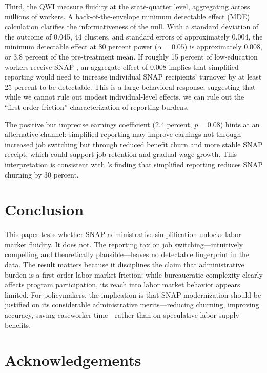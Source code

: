\documentclass[12pt]{article}
\begin{document}
Third, the QWI measure fluidity at the state-quarter level, aggregating across millions of workers. A back-of-the-envelope minimum detectable effect (MDE) calculation clarifies the informativeness of the null. With a standard deviation of the outcome of 0.045, 44 clusters, and standard errors of approximately 0.004, the minimum detectable effect at 80 percent power ($\alpha = 0.05$) is approximately 0.008, or 3.8 percent of the pre-treatment mean. If roughly 15 percent of low-education workers receive SNAP \citep{gray2019snap}, an aggregate effect of 0.008 implies that simplified reporting would need to increase individual SNAP recipients' turnover by at least 25 percent to be detectable. This is a large behavioral response, suggesting that while we cannot rule out modest individual-level effects, we can rule out the ``first-order friction'' characterization of reporting burdens.

The positive but imprecise earnings coefficient (2.4 percent, $p = 0.08$) hints at an alternative channel: simplified reporting may improve earnings not through increased job switching but through reduced benefit churn and more stable SNAP receipt, which could support job retention and gradual wage growth. This interpretation is consistent with \citet{gray2019snap}'s finding that simplified reporting reduces SNAP churning by 30 percent.

\section{Conclusion}

This paper tests whether SNAP administrative simplification unlocks labor market fluidity. It does not. The reporting tax on job switching---intuitively compelling and theoretically plausible---leaves no detectable fingerprint in the data. The result matters because it disciplines the claim that administrative burden is a first-order labor market friction: while bureaucratic complexity clearly affects program participation, its reach into labor market behavior appears limited. For policymakers, the implication is that SNAP modernization should be justified on its considerable administrative merits---reducing churning, improving accuracy, saving caseworker time---rather than on speculative labor supply benefits.

\section*{Acknowledgements}
\end{document}
